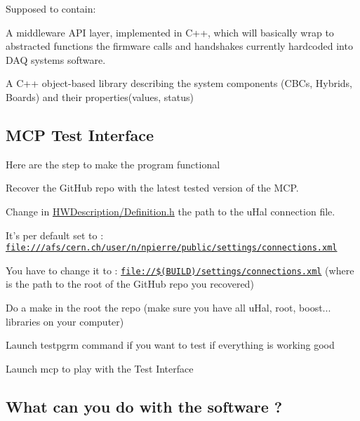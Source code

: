 Supposed to contain\-:


\begin{DoxyItemize}
\item A middleware A\-P\-I layer, implemented in C++, which will basically wrap to abstracted functions the firmware calls and handshakes currently hardcoded into D\-A\-Q systems software.
\item A C++ object-\/based library describing the system components (C\-B\-Cs, Hybrids, Boards) and their properties(values, status)
\end{DoxyItemize}

\subsection*{M\-C\-P Test Interface }

Here are the step to make the program functional


\begin{DoxyEnumerate}
\item Recover the Git\-Hub repo with the latest tested version of the M\-C\-P.
\item Change in \hyperlink{_definition_8h}{H\-W\-Description/\-Definition.\-h} the path to the u\-Hal connection file.
\begin{DoxyItemize}
\item It's per default set to \-: \href{file:///afs/cern.ch/user/n/npierre/public/settings/connections.xml}{\tt file\-:///afs/cern.\-ch/user/n/npierre/public/settings/connections.\-xml}
\item You have to change it to \-: \href{file://$(BUILD)/settings/connections.xml}{\tt file\-://\$(\-B\-U\-I\-L\-D)/settings/connections.\-xml} (where  is the path to the root of the Git\-Hub repo you recovered)
\end{DoxyItemize}
\item Do a make in the root the repo (make sure you have all u\-Hal, root, boost... libraries on your computer)
\item Launch testpgrm command if you want to test if everything is working good
\item Launch mcp to play with the Test Interface
\end{DoxyEnumerate}

\subsection*{What can you do with the software ? }

